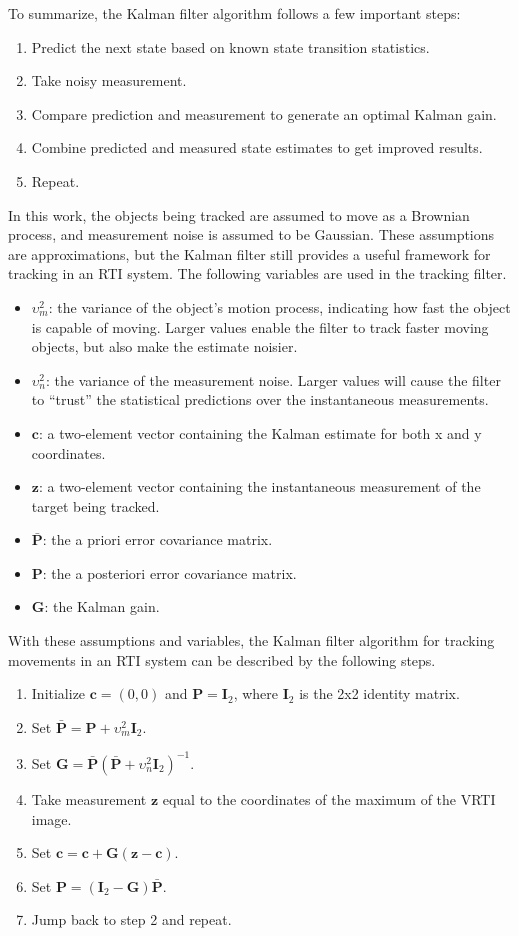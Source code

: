 \documentclass[journal]{IEEEtran}
\begin{document}
To summarize, the Kalman filter algorithm follows a few important steps:
\begin{enumerate}
\item Predict the next state based on known state transition statistics.
\item Take noisy measurement.
\item Compare prediction and measurement to generate an optimal Kalman gain.
\item Combine predicted and measured state estimates to get improved results.
\item Repeat.
\end{enumerate}

In this work, the objects being tracked are assumed to move as a Brownian process, and measurement noise is assumed to be Gaussian. These assumptions are approximations, but the Kalman filter still provides a useful framework for tracking in an RTI system.  The following variables are used in the tracking filter.
\begin{itemize}
\item $\upsilon^2_m$: the variance of the object's motion process, indicating how fast the object is capable of moving. Larger values enable the filter to track faster moving objects, but also make the estimate noisier.
\item $\upsilon^2_n$: the variance of the measurement noise. Larger values will cause the filter to ``trust'' the statistical predictions over the instantaneous measurements.
\item $\textbf{c}$: a two-element vector containing the Kalman estimate for both x and y coordinates.
\item $\textbf{z}$: a two-element vector containing the instantaneous measurement of the target being tracked.
\item $\bar{\textbf{P}}$: the a priori error covariance matrix.
\item $\textbf{P}$: the a posteriori error covariance matrix.
\item $\textbf{G}$: the Kalman gain.
\end{itemize}

With these assumptions and variables, the Kalman filter algorithm for tracking movements in an RTI system can be described by the following steps.
\begin{enumerate}
\item Initialize $\textbf{c}=(0,0)$ and $\textbf{P}=\textbf{I}_2$, where $\textbf{I}_2$ is the 2x2 identity matrix.
\item Set $\bar{\textbf{P}} = \textbf{P} + \upsilon^2_m \textbf{I}_2$.
\item Set $\textbf{G}= \bar{\textbf{P}}(\bar{\textbf{P}}+ \upsilon^2_n \textbf{I}_2)^{-1}$.
\item Take measurement $\textbf{z}$ equal to the coordinates of the maximum of the VRTI image.
\item Set $\textbf{c} = \textbf{c} + \textbf{G}(\textbf{z}-\textbf{c})$.
\item Set $\textbf{P} = (\textbf{I}_2-\textbf{G}) \bar{\textbf{P}}$.
\item Jump back to step 2 and repeat.
\end{enumerate}
\end{document}

